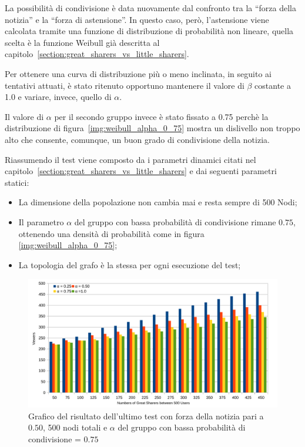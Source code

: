 La possibilità di condivisione è data nuovamente dal confronto tra la ``forza della notizia'' e la ``forza di astensione''. 
In questo caso, però, l'astensione viene calcolata tramite una funzione di distribuzione di probabilità non lineare,
quella scelta è la funzione Weibull già descritta al capitolo~\ref{section:great_sharers_vs_little_sharers}.

Per ottenere una curva di distribuzione più o meno inclinata, in seguito ai tentativi attuati, 
è stato ritenuto opportuno mantenere il valore di $\beta$ costante a 1.0 e variare, invece, quello di $\alpha$.

Il valore di $\alpha$ per il secondo gruppo invece è stato fissato a 0.75 perchè 
la distribuzione di figura~\ref{img:weibull_alpha_0_75} mostra un dislivello non troppo 
alto che consente, comunque, un buon grado di condivisione della notizia.

Riassumendo il test viene composto da i parametri dinamici citati nel 
capitolo~\ref{section:great_sharers_vs_little_sharers} e dai seguenti parametri statici:
\begin{itemize}
\item La dimensione della popolazione non cambia mai e resta sempre di 500 Nodi;
\item Il parametro $\alpha$ del gruppo con bassa probabilità di condivisione rimane $0.75$, 
ottenendo una densità di probabilità come in figura \ref{img:weibull_alpha_0_75};
\item La topologia del grafo è la stessa per ogni esecuzione del test;
\end{itemize}


\begin{figure}[!ht]
\centerline {
  \includegraphics[width=1\textwidth]{charts/last-test-str_0.5.pdf}
}
\caption{Grafico del risultato dell'ultimo test con forza della notizia pari a $0.50$, 
500 nodi totali e $\alpha$ del gruppo con bassa probabilità di condivisione = $0.75$}
\label{img:last_test_str_0_5}
\end{figure}

